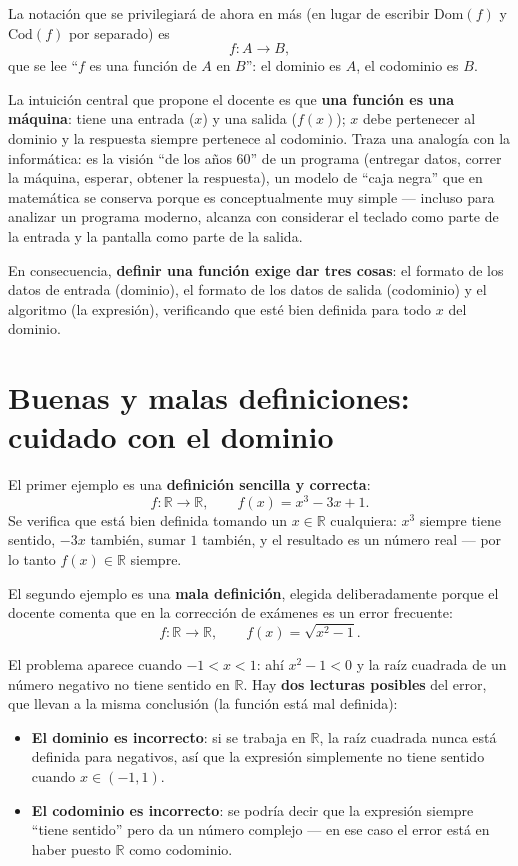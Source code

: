 \documentclass[12pt,a4paper]{article}
\begin{document}
La notación que se privilegiará de ahora en más (en lugar de escribir $\mathrm{Dom}(f)$ y $\mathrm{Cod}(f)$ por separado) es
$$f : A \to B,$$
que se lee ``$f$ es una función de $A$ en $B$'': el dominio es $A$, el codominio es $B$.

La intuición central que propone el docente es que \textbf{una función es una máquina}: tiene una entrada ($x$) y una salida ($f(x)$); $x$ debe pertenecer al dominio y la respuesta siempre pertenece al codominio. Traza una analogía con la informática: es la visión ``de los años 60'' de un programa (entregar datos, correr la máquina, esperar, obtener la respuesta), un modelo de ``caja negra'' que en matemática se conserva porque es conceptualmente muy simple --- incluso para analizar un programa moderno, alcanza con considerar el teclado como parte de la entrada y la pantalla como parte de la salida.

En consecuencia, \textbf{definir una función exige dar tres cosas}: el formato de los datos de entrada (dominio), el formato de los datos de salida (codominio) y el algoritmo (la expresión), verificando que esté bien definida para todo $x$ del dominio.

\section{Buenas y malas definiciones: cuidado con el dominio}

El primer ejemplo es una \textbf{definición sencilla y correcta}:
$$f : \mathbb{R} \to \mathbb{R}, \qquad f(x) = x^3 - 3x + 1.$$
Se verifica que está bien definida tomando un $x \in \mathbb{R}$ cualquiera: $x^3$ siempre tiene sentido, $-3x$ también, sumar $1$ también, y el resultado es un número real --- por lo tanto $f(x) \in \mathbb{R}$ siempre.

El segundo ejemplo es una \textbf{mala definición}, elegida deliberadamente porque el docente comenta que en la corrección de exámenes es un error frecuente:
$$f : \mathbb{R} \to \mathbb{R}, \qquad f(x) = \sqrt{x^2 - 1}.$$

El problema aparece cuando $-1 < x < 1$: ahí $x^2 - 1 < 0$ y la raíz cuadrada de un número negativo no tiene sentido en $\mathbb{R}$. Hay \textbf{dos lecturas posibles} del error, que llevan a la misma conclusión (la función está mal definida):

\begin{itemize}
  \item \textbf{El dominio es incorrecto}: si se trabaja en $\mathbb{R}$, la raíz cuadrada nunca está definida para negativos, así que la expresión simplemente no tiene sentido cuando $x \in (-1,1)$.
  \item \textbf{El codominio es incorrecto}: se podría decir que la expresión siempre ``tiene sentido'' pero da un número complejo --- en ese caso el error está en haber puesto $\mathbb{R}$ como codominio.
\end{itemize}
\end{document}
